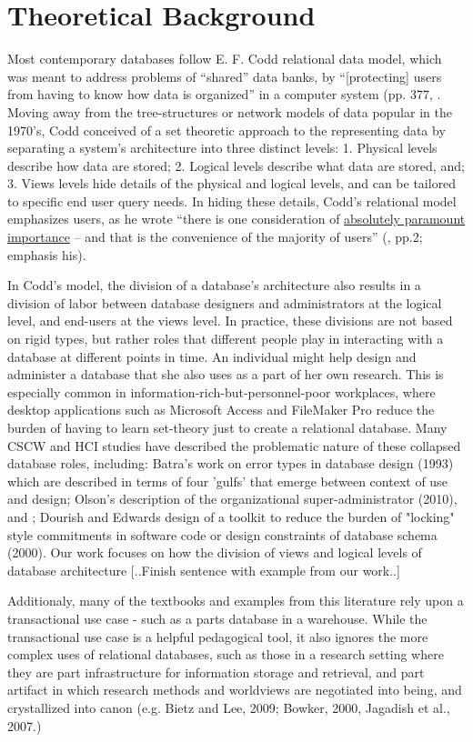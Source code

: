 \section{Theoretical Background}
Most contemporary databases follow E. F. Codd relational data model, which was meant to address problems of “shared” data banks, by  “[protecting] users from having to know how data is organized” in a computer system (pp. 377, \cite{Codd_1970}. Moving away from the tree-structures or network models of data popular in the 1970's, Codd conceived of a set theoretic approach to the representing data by separating a system's architecture into three distinct levels: 1. Physical levels describe how data are stored; 2. Logical levels describe what data are stored, and; 3. Views levels hide details of the physical and logical levels, and can be tailored to specific end user query needs. In hiding these details, Codd's relational model emphasizes users, as he wrote “there is one consideration of \underline{absolutely paramount importance} – and that is the convenience of the majority of users” (\cite{Codd_1971}, pp.2; emphasis his).  

In Codd's model, the division of a database's architecture also results in a division of labor between database designers and administrators at the logical level, and end-users at the views level. In practice, these divisions are not based on rigid types, but rather roles that different people play in interacting with a database at different points in time. An individual might help design and administer a database that she also uses as a part of her own research. This is especially common in information-rich-but-personnel-poor workplaces, where desktop applications such as Microsoft Access and FileMaker Pro reduce the burden of having to learn set-theory just to create a relational database. Many CSCW and HCI studies have described the problematic nature of these collapsed database roles, including: Batra's work on error types in database design (1993) which are described in terms of  four 'gulfs' that emerge between context of use and design; Olson's description of the organizational super-administrator (2010), and ; Dourish and Edwards design of a toolkit to reduce the burden of "locking" style commitments in software code or design constraints of database schema (2000). Our work focuses on how the division of views and logical levels of database architecture [..Finish sentence with example from our work..] 

Additionaly, many of the textbooks and examples from this literature rely upon a transactional use case - such as a parts database in a warehouse. While the transactional use case is a helpful pedagogical tool, it also  ignores the more complex uses of relational databases, such as those in a research setting where they are part infrastructure for information storage and retrieval, and part artifact in which research methods and worldviews are negotiated into being, and crystallized into canon (e.g. Bietz and Lee, 2009; Bowker, 2000, Jagadish et al., 2007.)  

